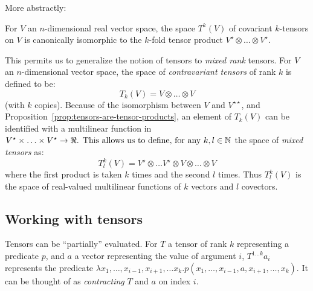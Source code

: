 \documentclass{article} %
\begin{document}
More abstractly:
\begin{proposition}\label{prop:tensors-are-tensor-products} For \(V\) an \(n\)-dimensional real vector space, the space \(T^k(V)\) of covariant \(k\)-tensors on \(V\) is canonically isomorphic to the \(k\)-fold tensor product \(V^{\star}\otimes \ldots \otimes V^{\star}\). 
\end{proposition}

This permits us to generalize the notion of tensors to {\em mixed rank} tensors. For \(V\) an \(n\)-dimensional vector space, the space of {\em contravariant tensors} of rank \(k\) is defined to be:
\[
T_k(V) = V \otimes \ldots \otimes V \]
(with \(k\) copies). Because of the isomorphism between \(V\) and \(V^{\star\star}\), and Proposition~\ref{prop:tensors-are-tensor-products}, an element of \(T_k(V)\) can be identified with a multilinear function in \(V^{\star} \times \ldots \times V^{\star} \rightarrow \Re$. This allows us to define, for any \(k, l \in \mathbb{N}\) the space of {\em mixed tensors} as:
\[T^k_l(V) = V^{\star}\otimes \ldots V^{\star}\otimes V\otimes \ldots \otimes V\]
\noindent where the first product is taken \(k\) times and the second \(l\) times.  Thus \(T^k_l(V)\) is the space of real-valued multilinear functions of \(k\) vectors and \(l\) covectors. 

\subsection{Working with tensors}
  
Tensors can be ``partially'' evaluated. For \(T\) a tensor of rank \(k\) representing a predicate \(p\), and \(a\) a vector representing the value of argument \(i\), \(T^{1\ldots k}a_i\) represents the predicate \(\lambda x_1, \ldots, x_{i-1},x_{i+1},\ldots x_k. p(x_1, \ldots, x_{i-1}, a, x_{i+1}, \ldots, x_k)\). It can be thought of as {\em contracting} \(T\) and \(a\) on index \(i\).
  
\end{document}
